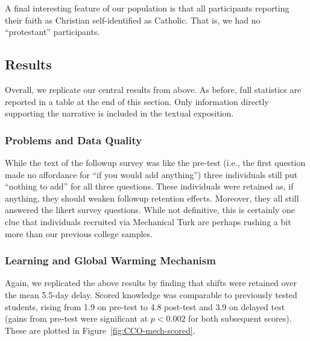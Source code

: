 A final interesting feature of our population is that all participants reporting
their faith as Christian self-identified as Catholic. That is, we had no
“protestant” participants.


\subsection{Results}

Overall, we replicate our central results from above. As before, full statistics
are reported in a table at the end of this section. Only information directly
supporting the narrative is included in the textual exposition.

\subsubsection{Problems and Data Quality}

While the text of the followup survey was like the pre-test (i.e., the first
question made no affordance for “if you would add anything”) three individuals
still put “nothing to add” for all three questions. These individuals were
retained as, if anything, they should weaken followup retention effects.
Moreover, they all still answered the likert survey questions. While not
definitive, this is certainly one clue that individuals recruited via Mechanical
Turk are perhaps rushing a bit more than our previous college samples.

\subsubsection{Learning and Global Warming Mechanism}

Again, we replicated the above results by 
finding that shifts were retained over the mean 5.5-day
delay.  Scored knowledge was comparable to previously tested students, rising
from 1.9 on pre-test to 4.8 post-test and 3.9 on delayed test (gains from pre-test
were significant at $p<0.002$ for both subsequent scores). These are plotted in
Figure~\ref{fig:CCO-mech-scored}. 

